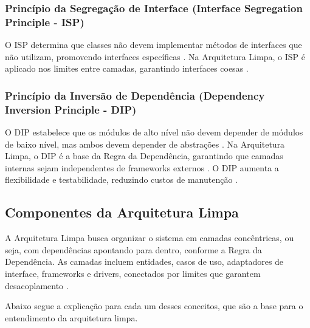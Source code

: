             \subsubsection{Princípio da Segregação de Interface (Interface Segregation Principle - ISP)}
            
                \par O ISP determina que classes não devem implementar métodos de interfaces que não utilizam, promovendo interfaces específicas \cite{livro:martin:cleanarch}. Na Arquitetura Limpa, o ISP é aplicado nos limites entre camadas, garantindo interfaces coesas \cite{livro:martin:cleanarch}.
                
            \subsubsection{Princípio da Inversão de Dependência (Dependency Inversion Principle - DIP)}
            
                \par O DIP estabelece que os módulos de alto nível não devem depender de módulos de baixo nível, mas ambos devem depender de abstrações \cite{livro:martin:cleanarch}. Na Arquitetura Limpa, o DIP é a base da Regra da Dependência, garantindo que camadas internas sejam independentes de frameworks externos \cite{livro:martin:cleanarch}. O DIP aumenta a flexibilidade e testabilidade, reduzindo custos de manutenção \cite{artigo:dantas:2021}.
            
    \subsection{Componentes da Arquitetura Limpa}
        \par A Arquitetura Limpa busca organizar o sistema em camadas concêntricas, ou seja, com dependências apontando para dentro, conforme a Regra da Dependência. As camadas incluem entidades, casos de uso, adaptadores de interface, frameworks e drivers, conectados por limites que garantem desacoplamento \cite{livro:martin:cleanarch}.
        
        \par Abaixo segue a explicação para cada um desses conceitos, que são a base para o entendimento da arquitetura limpa.

